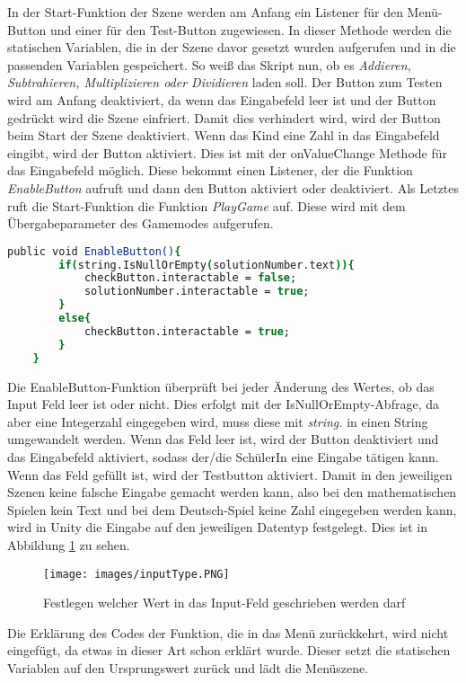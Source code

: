 In der Start-Funktion der Szene werden am Anfang ein Listener für den Menü-Button und einer für den Test-Button zugewiesen. In dieser Methode werden die statischen Variablen, die in der Szene davor gesetzt wurden aufgerufen und in die passenden Variablen gespeichert.
So weiß das Skript nun, ob es \textit{Addieren, Subtrahieren, Multiplizieren oder Dividieren} laden soll. Der Button zum Testen wird am Anfang deaktiviert, da wenn das Eingabefeld leer ist und der Button gedrückt wird die Szene einfriert. Damit dies verhindert wird, wird der Button beim Start der Szene deaktiviert. Wenn das Kind eine Zahl in das Eingabefeld eingibt, wird der Button aktiviert. Dies ist mit der onValueChange Methode für das Eingabefeld möglich. Diese bekommt einen Listener, der die Funktion \textit{EnableButton} aufruft und dann den Button aktiviert oder deaktiviert. Als Letztes ruft die Start-Funktion die Funktion \textit{PlayGame} auf. Diese wird mit dem Übergabeparameter des Gamemodes aufgerufen.\\
\begin{lstlisting}[language=csh, caption={MathOperations.cs EnableButton-Funktion}]
	public void EnableButton(){
		if(string.IsNullOrEmpty(solutionNumber.text)){
			checkButton.interactable = false;
			solutionNumber.interactable = true;
		}
		else{
			checkButton.interactable = true;
		}
	}
\end{lstlisting}
Die EnableButton-Funktion überprüft bei jeder Änderung des Wertes, ob das Input Feld leer ist oder nicht. Dies erfolgt mit der IsNullOrEmpty-Abfrage, da aber eine Integerzahl eingegeben wird, muss diese mit \textit{string.} in einen String umgewandelt werden. Wenn das Feld leer ist, wird der Button deaktiviert und das Eingabefeld aktiviert, sodass der/die SchülerIn eine Eingabe tätigen kann. Wenn das Feld gefüllt ist, wird der Testbutton aktiviert. Damit in den jeweiligen Szenen keine falsche Eingabe gemacht werden kann, also bei den mathematischen Spielen kein Text und bei dem Deutsch-Spiel keine Zahl eingegeben werden kann, wird in Unity die Eingabe auf den jeweiligen Datentyp festgelegt. Dies ist in Abbildung \ref{inputField} zu sehen.
\begin{figure}[htbp]
  \centering
  \texttt{[image: images/inputType.PNG]}
  \caption{Festlegen welcher Wert in das Input-Feld geschrieben werden darf}
  \label{inputField}
\end{figure}
Die Erklärung des Codes der Funktion, die in das Menü zurückkehrt, wird nicht eingefügt, da etwas in dieser Art schon erklärt wurde. Dieser setzt die statischen Variablen auf den Ursprungswert zurück und lädt die Menüszene.\\
